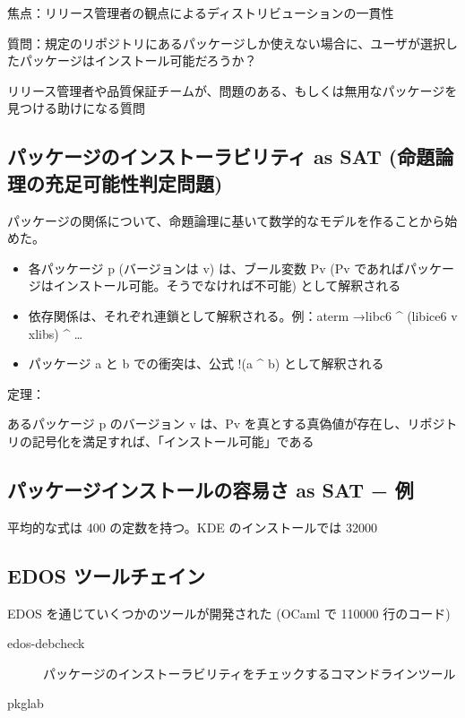 \documentclass[mingoth,a4paper]{jsarticle}
\begin{document}
\begin{commandline}
焦点：リリース管理者の観点によるディストリビューションの一貫性

質問：規定のリポジトリにあるパッケージしか使えない場合に、ユーザが選択したパッケージはインストール可能だろうか？

リリース管理者や品質保証チームが、問題のある、もしくは無用なパッケージを見つける助けになる質問



\subsection{パッケージのインストーラビリティ as SAT (命題論理の充足可能性判定問題)}

パッケージの関係について、命題論理に基いて数学的なモデルを作ることから始めた。

\begin{itemize}
\item 各パッケージ p (バージョンは v) は、ブール変数 Pv (Pv であればパッケージはインストール可能。そうでなければ不可能) として解釈される
\item 依存関係は、それぞれ連鎖として解釈される。例：aterm →libc6 \^{} (libice6 v xlibs) \^{} \dots{}
\item パッケージ a と b での衝突は、公式 !(a \^{} b) として解釈される
\end{itemize}

定理：

あるパッケージ p のバージョン v は、Pv を真とする真偽値が存在し、リポジトリの記号化を満足すれば、「インストール可能」である


\subsection{パッケージインストールの容易さ as SAT − 例}


平均的な式は 400 の定数を持つ。KDE のインストールでは 32000


\subsection{EDOS ツールチェイン}

EDOS を通じていくつかのツールが開発された (OCaml で 110000 行のコード)

\begin{description}
\item[edos-debcheck] \mbox{}

パッケージのインストーラビリティをチェックするコマンドラインツール
\item[pkglab] \mbox{}


\end{description}
\end{commandline}
\end{document}
